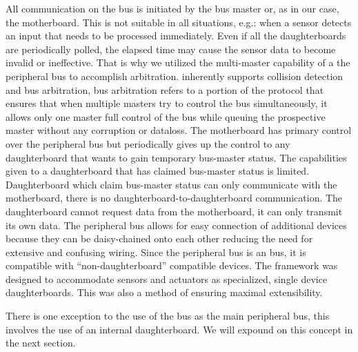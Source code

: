 	All communication on the \iic bus is initiated by the bus master or, as in our case, the motherboard. This is not suitable in all situations, e.g.: when a sensor detects an input that needs to be processed immediately. Even if all the daughterboards are periodically polled, the elapsed time may cause the sensor data to become invalid or ineffective. That is why we utilized the multi-master capability of a the \iic peripheral bus to accomplish arbitration. \iic inherently supports collision detection and bus arbitration, bus arbitration refers to a portion of the protocol that ensures that when multiple masters try to control the bus simultaneously, it allows only one master full control of the bus while queuing the prospective master without any corruption or dataloss\parencite{nxpi2c}. The motherboard has primary control over the peripheral bus but periodically gives up the control to any daughterboard that wants to gain temporary bus-master status. The capabilities given to a daughterboard that has claimed bus-master status is limited. Daughterboard which claim bus-master status can only communicate with the motherboard, there is no daughterboard-to-daughterboard communication. The daughterboard cannot request data from the motherboard, it can only transmit its own data.
	The peripheral bus allows for easy connection of additional devices because they can be daisy-chained onto each other reducing the need for extensive and confusing wiring. Since the peripheral bus is an \iic bus, it is compatible with ``non-daughterboard'' \iic compatible devices. The framework was designed to accommodate sensors and actuators as specialized, single device daughterboards. This was also a method of ensuring maximal extensibility.
	
	There is one exception to the use of the \iic bus as the main peripheral bus, this involves the use of an internal daughterboard. We will expound on this concept in the next section.
	
